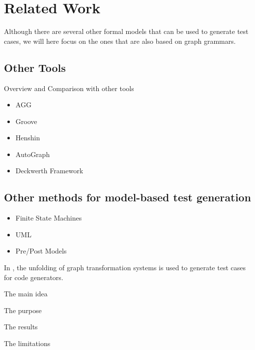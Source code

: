 \chapter{Related Work}\label{ch:related-work}

Although there are several other formal models that can be used to generate test cases, we will here focus on the ones that are also based on graph grammars.

\section{Other Tools}

Overview and Comparison with other tools

\begin{itemize}
\item AGG
\item Groove
\item Henshin
\item AutoGraph
\item Deckwerth Framework
\end{itemize}

\section{Other methods for model-based test generation}

\begin{itemize}
  \item Finite State Machines
  \item UML
  \item Pre/Post Models
\end{itemize}

In \cite{Baldan2004}, the unfolding of graph transformation systems is used to generate test cases for code generators. 

The main idea

The purpose

The results

The limitations

\cite{Runge2013}
